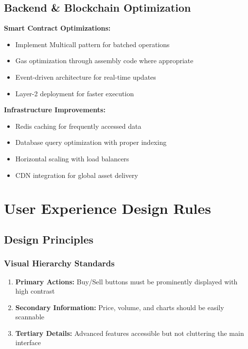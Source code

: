\documentclass{article}
\begin{document}
\subsection{Backend \& Blockchain Optimization}

\textbf{Smart Contract Optimizations:}
\begin{itemize}[leftmargin=*]
    \item Implement Multicall pattern for batched operations
    \item Gas optimization through assembly code where appropriate
    \item Event-driven architecture for real-time updates
    \item Layer-2 deployment for faster execution
\end{itemize}

\textbf{Infrastructure Improvements:}
\begin{itemize}[leftmargin=*]
    \item Redis caching for frequently accessed data
    \item Database query optimization with proper indexing
    \item Horizontal scaling with load balancers
    \item CDN integration for global asset delivery
\end{itemize}

\section{User Experience Design Rules}

\subsection{Design Principles}

\subsubsection{Visual Hierarchy Standards}
\begin{enumerate}[leftmargin=*]
    \item \textbf{Primary Actions:} Buy/Sell buttons must be prominently displayed with high contrast
    \item \textbf{Secondary Information:} Price, volume, and charts should be easily scannable
    \item \textbf{Tertiary Details:} Advanced features accessible but not cluttering the main interface
\end{enumerate}
\end{document}
